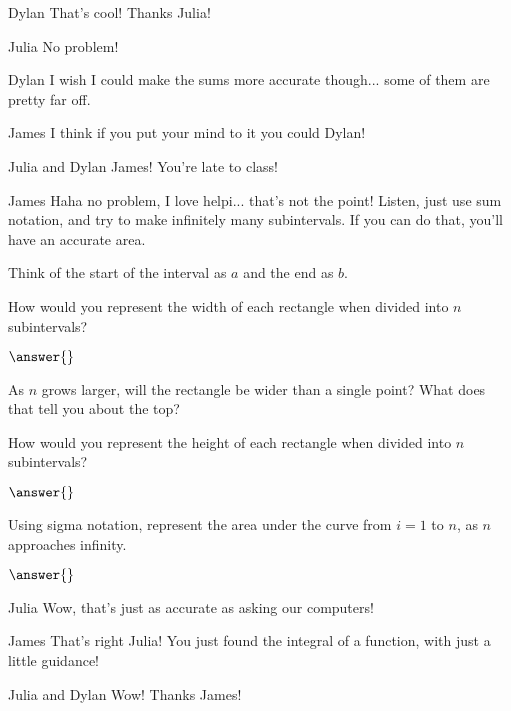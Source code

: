 \documentclass{ximera}
\begin{document}
\begin{dialogue}
\item[Dylan] That's cool! Thanks Julia!
\item[Julia] No problem!
\item[Dylan] I wish I could make the sums more accurate though... some of them are pretty far off.
\item[James] I think if you put your mind to it you could Dylan!
\item[Julia and Dylan] James! You're late to class!
\item[James] Haha no problem, I love helpi... that's not the point! Listen, just use sum notation, and try to make infinitely many subintervals. If you can do that, you'll have an accurate area.
\end{dialogue}
\begin{question}

\begin{hint}
Think of the start of the interval as $a$ and the end as $b$.
\end{hint}

How would you represent the width of each rectangle when divided into $n$ subintervals?

$\answer{}$

\begin{hint}
As $n$ grows larger, will the rectangle be wider than a single point? What does that tell you about the top?
\end{hint}

How would you represent the height of each rectangle when divided into $n$ subintervals?

$\answer{}$

Using sigma notation, represent the area under the curve from $i = 1$ to $n$, as $n$ approaches infinity.

$\answer{}$

\end{question}
\begin{dialogue}
\item[Julia] Wow, that's just as accurate as asking our computers!
\item[James] That's right Julia! You just found the integral of a function, with just a little guidance!
\item[Julia and Dylan] Wow! Thanks James!
\end{dialogue}
\end{document}
